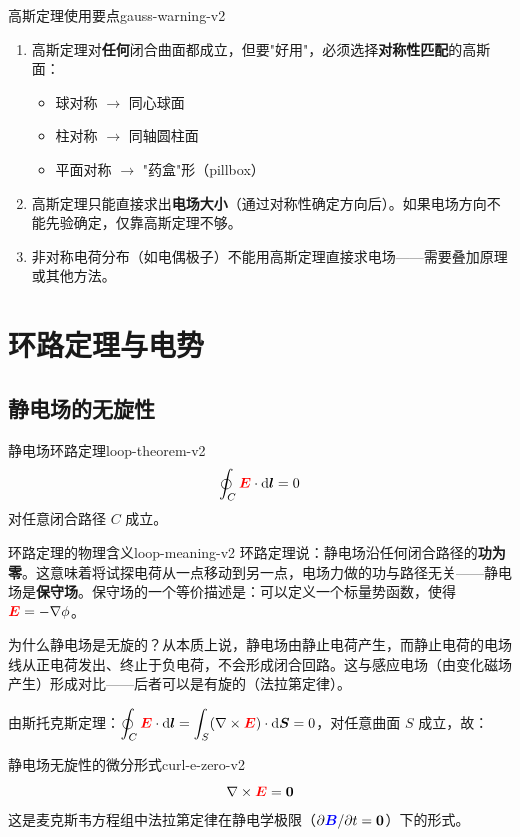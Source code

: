 \documentclass[11pt,a4paper,openany,oneside]{book}
\newcommand{\diff}{\mathrm{d}}
\newcommand{\vecE}{\textcolor{red}{\vect{E}}}
\newcommand{\vecB}{\textcolor{blue}{\vect{B}}}
\newcommand{\vect}[1]{\bm{#1}}
\newcommand{\grad}{\nabla}
\newcommand{\curl}{\nabla\times}
\begin{document}
\begin{warning}{高斯定理使用要点}{gauss-warning-v2}
\begin{enumerate}
\item 高斯定理对\textbf{任何}闭合曲面都成立，但要"好用"，必须选择\textbf{对称性匹配}的高斯面：
  \begin{itemize}
  \item 球对称 $\to$ 同心球面
  \item 柱对称 $\to$ 同轴圆柱面
  \item 平面对称 $\to$ "药盒"形（pillbox）
  \end{itemize}
\item 高斯定理只能直接求出\textbf{电场大小}（通过对称性确定方向后）。如果电场方向不能先验确定，仅靠高斯定理不够。
\item 非对称电荷分布（如电偶极子）不能用高斯定理直接求电场——需要叠加原理或其他方法。
\end{enumerate}
\end{warning}

\section{环路定理与电势}

\subsection{静电场的无旋性}

\begin{theorem}{静电场环路定理}{loop-theorem-v2}
\[
\oint_C \vecE \cdot \diff\vect{l} = 0
\]
对任意闭合路径 $C$ 成立。
\end{theorem}

\begin{insight}{环路定理的物理含义}{loop-meaning-v2}
环路定理说：静电场沿任何闭合路径的\textbf{功为零}。这意味着将试探电荷从一点移动到另一点，电场力做的功与路径无关——静电场是\textbf{保守场}。保守场的一个等价描述是：可以定义一个标量势函数，使得 $\vecE = -\grad\phi$。

为什么静电场是无旋的？从本质上说，静电场由静止电荷产生，而静止电荷的电场线从正电荷发出、终止于负电荷，不会形成闭合回路。这与感应电场（由变化磁场产生）形成对比——后者可以是有旋的（法拉第定律）。
\end{insight}

由斯托克斯定理：$\displaystyle\oint_C \vecE \cdot \diff\vect{l} = \int_S (\curl\vecE) \cdot \diff\vect{S} = 0$，对任意曲面 $S$ 成立，故：

\begin{theorem}{静电场无旋性的微分形式}{curl-e-zero-v2}
\[
\curl\vecE = \vect{0}
\]
这是麦克斯韦方程组中法拉第定律在静电学极限（$\partial\vecB/\partial t = \vect{0}$）下的形式。
\end{theorem}
\end{document}
